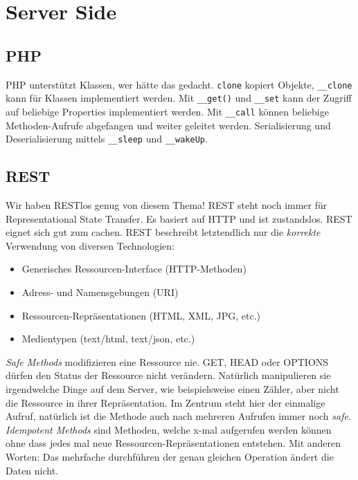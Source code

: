 \chapter{Server Side}

\section{PHP}

PHP unterstützt Klassen, wer hätte das gedacht. \lstinline|clone| kopiert Objekte, \lstinline|__clone| kann für Klassen implementiert werden. Mit \lstinline|__get()| und \lstinline|__set| kann der Zugriff auf beliebige Properties implementiert werden. Mit \lstinline|__call| können beliebige Methoden-Aufrufe
abgefangen und weiter geleitet werden. Serialisierung und Deserialisierung mittels \lstinline|__sleep| und \lstinline|__wakeUp|.

\section{REST}
Wir haben RESTlos genug von diesem Thema! REST steht noch immer für Representational State Transfer. Es basiert auf HTTP und ist zustandslos. REST eignet sich gut zum cachen. REST beschreibt letztendlich nur die \emph{korrekte} Verwendung von diversen Technologien:

\begin{itemize}
	\item Generisches Ressourcen-Interface (HTTP-Methoden)
	\item Adress- und Namensgebungen (URI)
	\item Ressourcen-Repräsentationen (HTML, XML, JPG, etc.)
	\item Medientypen (text/html, text/json, etc.)	
\end{itemize}

\emph{Safe Methods} modifizieren eine Ressource nie. GET, HEAD oder OPTIONS dürfen den Status der Ressource nicht verändern. Natürlich manipulieren sie irgendwelche Dinge auf dem Server, wie beispielsweise einen Zähler, aber nicht die Ressource in ihrer Repräsentation. Im Zentrum steht hier der einmalige Aufruf, natürlich ist die Methode auch nach mehreren Aufrufen immer noch \emph{safe}. \emph{Idempotent Methods} sind Methoden, welche x-mal aufgerufen werden können ohne dass jedes mal neue Ressourcen-Repräsentationen entstehen. Mit anderen Worten: Das mehrfache durchführen der genau gleichen Operation ändert die Daten nicht.

